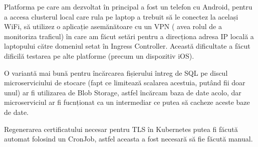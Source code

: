Platforma pe care am dezvoltat în principal a fost un telefon cu Android, pentru a accesa clusterul local
care rula pe laptop a trebuit să le conectez la același WiFi, să utilizez o aplicație asemănătoare cu un VPN (
avea rolul de a monitoriza traficul) în care am făcut setări pentru a direcționa adresa IP locală a laptopului
către domeniul setat în Ingress Controller. Această dificultate a făcut dificilă testarea pe alte platforme (precum un dispozitiv iOS).

O variantă mai bună pentru încărcarea fișierului întreg de SQL pe discul microserviciului de stocare
(fapt ce limitează scalarea acestuia, putând fii doar unul) ar fi utilizarea de Blob Storage, astfel
încărcam baza de date acolo, dar microserviciul ar fi fucnționat ca un intermediar ce putea să cacheze aceste baze de date.

Regenerarea certificatului necesar pentru TLS în Kubernetes putea fi făcută automat folosind un CronJob, astfel
aceasta a fost necesară să fie făcută manual.

